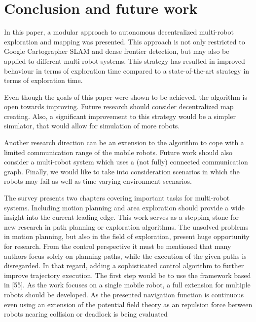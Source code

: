 \section{Conclusion and future work} \label{sec:conclusion}

In this paper, a modular approach to autonomous decentralized multi-robot exploration and mapping was presented. This approach is not only restricted to Google Cartographer SLAM and dense frontier detection, but may also be applied to different multi-robot systems. This strategy has resulted in improved behaviour in terms of exploration time compared to a state-of-the-art strategy in terms of exploration time. 

Even though the goals of this paper were shown to be achieved, the algorithm is open towards improving. Future research should consider decentralized map creating. Also, a significant improvement to this strategy would be a simpler simulator, that would allow for simulation of more robots.

Another research direction can be an extension to the algorithm to cope with a limited communication range of the mobile robots. Future work should also consider a multi-robot system which uses a (not fully) connected communication graph. Finally, we would like to take into consideration scenarios in which the robots may fail as well as time-varying environment scenarios.

The survey presents two chapters covering important tasks
for multi-robot systems. Including motion planning and area
exploration should provide a wide insight into the current
leading edge. This work serves as a stepping stone for new
research in path planning or exploration algorithms.
The unsolved problems in motion planning, but also in the
field of exploration, present huge opportunity for research.
From the control perspective it must be mentioned that many
authors focus solely on planning paths, while the execution
of the given paths is disregarded. In that regard, adding a
sophisticated control algorithm to further improve trajectory
execution. The first step would be to use the framework based
in [55]. As the work focuses on a single mobile robot, a
full extension for multiple robots should be developed. As
the presented navigation function is continuous even using
an extension of the potential field theory as an repulsion
force between robots nearing collision or deadlock is being
evaluated